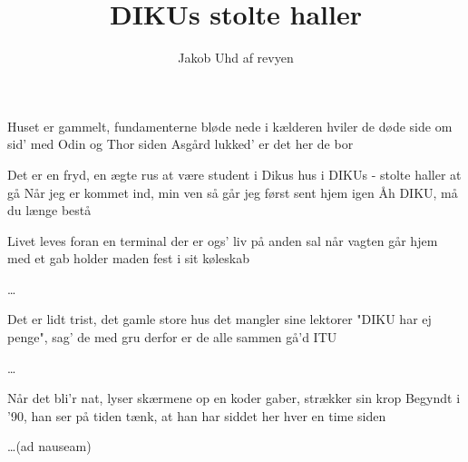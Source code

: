 \documentclass[danish]{article}
\title{DIKUs stolte haller}
\author{Jakob Uhd af revyen}
\begin{document}
\twocolumn[ %
\maketitle


]
\begin{song}

Huset er gammelt, fundamenterne bløde
nede i kælderen hviler de døde
side om sid' med Odin og Thor
siden Asgård lukked' er det her de bor

Det er en fryd, en ægte rus
at være student i Dikus hus
i DIKUs - stolte haller at gå
Når jeg er kommet ind, min ven
så går jeg først sent hjem igen
Åh DIKU, må du længe bestå

Livet leves foran en terminal
der er ogs' liv på anden sal
når vagten går hjem med et gab
holder maden fest i sit køleskab

\ldots

Det er lidt trist, det gamle store
hus det mangler sine lektorer
"DIKU har ej penge", sag' de med gru
derfor er de alle sammen gå'd ITU

\ldots

Når det bli'r nat, lyser skærmene op
en koder gaber, strækker sin krop
Begyndt i '90, han ser på tiden
tænk, at han har siddet her hver en time siden

\ldots (ad nauseam)

\end{song}
\end{document}
